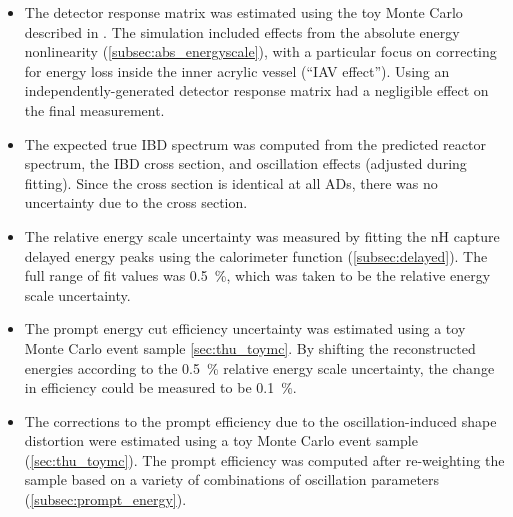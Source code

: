 \begin{itemize}
    \item The detector response matrix was estimated using the toy Monte Carlo
        described in  \cite{lbnl_toymc}.
        The simulation included effects from
        the absolute energy nonlinearity (\cref{subsec:abs_energyscale}),
        with a particular focus on correcting for energy loss inside the
        inner acrylic vessel (``IAV effect'').
        Using an independently-generated detector response matrix
        had a negligible effect on the final measurement.
    \item The expected true IBD spectrum was computed from
        the predicted reactor spectrum,
        the IBD cross section,
        and oscillation effects (adjusted during fitting).
        Since the cross section is identical at all ADs,
        there was no uncertainty due to the cross section.
    \item The relative energy scale uncertainty was measured
        by fitting the nH capture delayed energy peaks
        using the calorimeter function (\cref{subsec:delayed}).
        The full range of fit values was \SI{0.5}{\percent},
        which was taken to be the relative energy scale uncertainty.
    \item The prompt energy cut efficiency uncertainty
        was estimated using a toy Monte Carlo event sample \cref{sec:thu_toymc}.
        By shifting the reconstructed energies according to the
        \SI{0.5}{\percent} relative energy scale uncertainty,
        the change in efficiency could be measured to be \SI{0.1}{\percent}.
    \item The corrections to the prompt efficiency
        due to the oscillation-induced shape distortion
        were estimated using a toy Monte Carlo event sample (\cref{sec:thu_toymc}).
        The prompt efficiency was computed after re-weighting the sample
        based on a variety of combinations of oscillation parameters
        (\cref{subsec:prompt_energy}).

\end{itemize}
